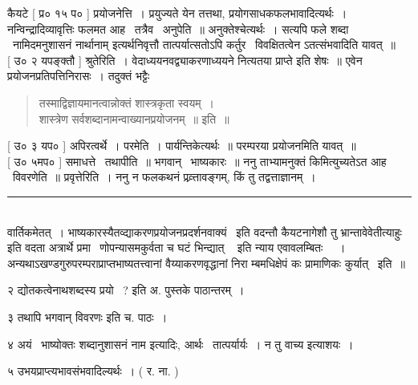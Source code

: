 \documentclass[11pt, openany]{book}
\begin{document}
\begin{multicols}{2}
कैयटे [ प्र० १५ प० ] प्रयोजनेत्ति~। प्रयुज्यते येन तत्तथा, प्रयोगसाधकफलभावादित्यर्थः~। नन्विन्द्रादिव्यावृत्तिः फलमत आह \textendash\ तत्रैव \textendash\ अनुपेति~॥ अनुक्तेश्चेत्यर्थः~। सत्यपि फले {\qt शब्दा \textendash\ नामिदमनुशासनं नार्थानाम्} इत्यर्थनिवृत्तौ तात्पर्यात्सतोऽपि कर्तुर \textendash\ विवक्षितत्वेन ऽतत्संभवादिति यावत्~॥\\

 [ उ० २ यपङ्क्तौ ] श्रुतेरिति~। वेदाध्ययनवद्व्याकरणाध्ययने नित्यतया प्राप्ते इति शेषः~॥ एवेन प्रयोजनप्रतिपत्तिनिरासः~। तदुक्तं भट्टैः \textendash\ 

\begin{quote}
{\qt तस्माद्विज्ञायमानत्वान्नोक्तं शास्त्रकृता स्वयम्~।\\
शास्त्रेण सर्वशब्दानामन्वाख्यानप्रयोजनम्~॥} इति~॥
\end{quote}

 [ उ० ३ यप० ] अपिरत्वर्थे~। परमेति~। पार्यन्तिकेत्यर्थः~॥ परम्परया प्रयोजनमिति यावत्~॥\\

 [ उ० ५मप० ] समाधत्ते \textendash\ तथापीति~॥ भगवान् \textendash\ भाष्यकारः~॥ ननु ताभ्यामनुक्तं किमित्युच्यतेऽत आह \textendash\ विवरणेति~॥ प्रवृत्तेरिति~। ननु न फलकथनं प्रव्र्त्तावङ्गम्, किं तु तद्वत्ताज्ञानम्~।\\

\noindent
\rule{1\linewidth}{0.5pt}\\

\noindent
वार्तिकमेतत्~। भाष्यकारस्यैतव्द्याकरणप्रयोजनप्रदर्शनवाक्यं \textendash\ इति वदन्तौ कैयटनागेशौ तु भ्रान्तावेवेतीत्याहुः इति वदता अत्रार्थे प्रमा \textendash\ णोपन्यासमकुर्वता च {\qt घटं भिन्द्यात् \textendash\ } इति न्याय एवावलम्बितः \textendash\ ~। अन्यथाऽखण्डगुरुपरम्पराप्राप्तभाष्यतत्त्वानां वैय्याकरणवृद्धानां निरा म्बमधिक्षेपं कः प्रामाणिकः कुर्यात् \textendash\ इति~॥

२ द्योतकत्वेनाथशब्दस्य प्रयो \textendash\ ? इति अ. पुस्तके पाठान्तरम्~। 

३ {\qt तथापि भगवान् विवरणः} इति च. पाठः~। 

४ अयं \textendash\ भाष्योक्तः {\qt शब्दानुशासनं नाम} इत्यादिः, आर्थः \textendash\ तात्पर्यार्यः~। न तु वाच्य इत्याशयः~।

५ उभयप्राप्त्यभावसंभवादिल्यर्थः~। ( र. ना. ) 
\end{multicols}

\newpage
\end{document}

